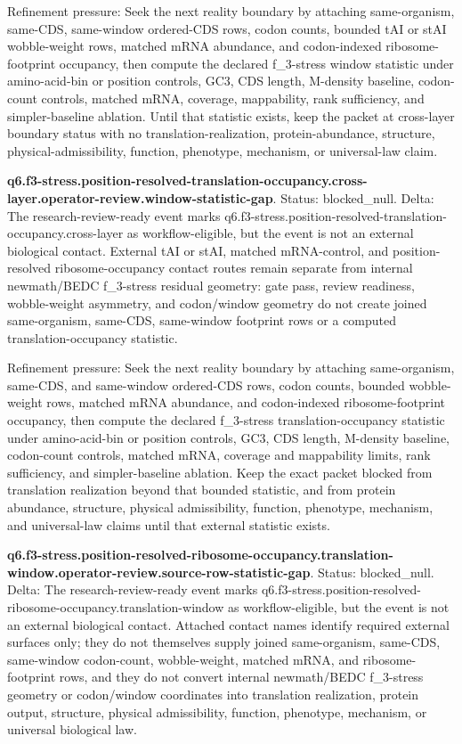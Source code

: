 Refinement pressure: Seek the next reality boundary by attaching same-organism, same-CDS, same-window ordered-CDS rows, codon counts, bounded tAI or stAI wobble-weight rows, matched mRNA abundance, and codon-indexed ribosome-footprint occupancy, then compute the declared f\_3-stress window statistic under amino-acid-bin or position controls, GC3, CDS length, M-density baseline, codon-count controls, matched mRNA, coverage, mappability, rank sufficiency, and simpler-baseline ablation. Until that statistic exists, keep the packet at cross-layer boundary status with no translation-realization, protein-abundance, structure, physical-admissibility, function, phenotype, mechanism, or universal-law claim.

\textbf{q6.f3-stress.position-resolved-translation-occupancy.cross-layer.operator-review.window-statistic-gap}. Status: blocked\_null. Delta: The research-review-ready event marks q6.f3-stress.position-resolved-translation-occupancy.cross-layer as workflow-eligible, but the event is not an external biological contact. External tAI or stAI, matched mRNA-control, and position-resolved ribosome-occupancy contact routes remain separate from internal newmath/BEDC f\_3-stress residual geometry: gate pass, review readiness, wobble-weight asymmetry, and codon/window geometry do not create joined same-organism, same-CDS, same-window footprint rows or a computed translation-occupancy statistic.

Refinement pressure: Seek the next reality boundary by attaching same-organism, same-CDS, and same-window ordered-CDS rows, codon counts, bounded wobble-weight rows, matched mRNA abundance, and codon-indexed ribosome-footprint occupancy, then compute the declared f\_3-stress translation-occupancy statistic under amino-acid-bin or position controls, GC3, CDS length, M-density baseline, codon-count controls, matched mRNA, coverage and mappability limits, rank sufficiency, and simpler-baseline ablation. Keep the exact packet blocked from translation realization beyond that bounded statistic, and from protein abundance, structure, physical admissibility, function, phenotype, mechanism, and universal-law claims until that external statistic exists.

\textbf{q6.f3-stress.position-resolved-ribosome-occupancy.translation-window.operator-review.source-row-statistic-gap}. Status: blocked\_null. Delta: The research-review-ready event marks q6.f3-stress.position-resolved-ribosome-occupancy.translation-window as workflow-eligible, but the event is not an external biological contact. Attached contact names identify required external surfaces only; they do not themselves supply joined same-organism, same-CDS, same-window codon-count, wobble-weight, matched mRNA, and ribosome-footprint rows, and they do not convert internal newmath/BEDC f\_3-stress geometry or codon/window coordinates into translation realization, protein output, structure, physical admissibility, function, phenotype, mechanism, or universal biological law.

